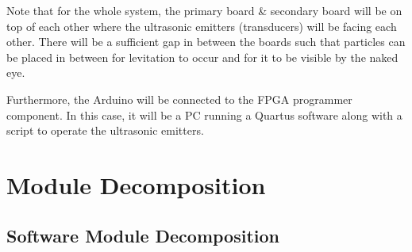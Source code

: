 \documentclass[12pt, titlepage]{article}
\begin{document}
Note that for the whole system, the primary board \& secondary board will be on top of each other where the ultrasonic emitters (transducers) will be facing each other. There will be a sufficient gap in between the boards such that particles can be placed in between for levitation to occur and for it to be visible by the naked eye.
\par
Furthermore, the Arduino will be connected to the FPGA programmer component. In this case, it will be a PC running a Quartus software along with a script to operate the ultrasonic emitters.
\par
\section{Module Decomposition}
\subsection{Software Module Decomposition}
\end{document}
